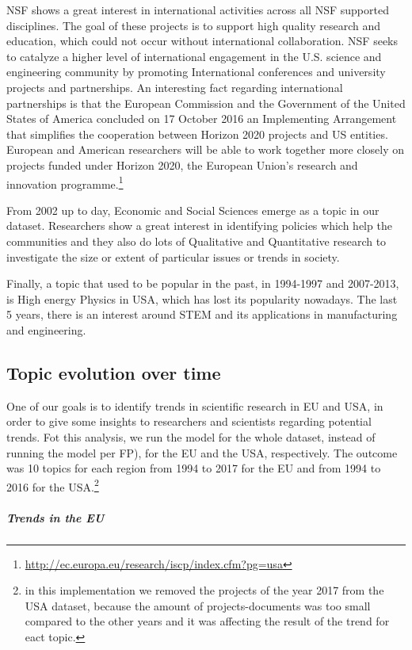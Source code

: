 \documentclass[12pt]{report}
\begin{document}
NSF shows a great interest in international activities across all NSF supported
disciplines. The goal of these projects is to support high quality research and
education, which could not occur without international collaboration. NSF seeks
to catalyze a higher level of international engagement in the U.S. science and
engineering community by promoting International conferences and university
projects and partnerships. An interesting fact regarding international
partnerships is that the European Commission and the Government of the United
States of America concluded on 17 October 2016 an Implementing Arrangement that
simplifies the cooperation between Horizon 2020 projects and US entities.
European and American researchers will be able to work together more closely on
projects funded under Horizon 2020, the European Union's research and innovation
programme.\footnote{\url{http://ec.europa.eu/research/iscp/index.cfm?pg=usa}}

From 2002 up to day, Economic and Social Sciences emerge as a topic in our
dataset. Researchers show a great interest in identifying policies which help
the communities and they also do lots of Qualitative and Quantitative research
to investigate the size or extent of particular issues or trends in society.

Finally, a topic that used to be popular in the past, in 1994-1997 and
2007-2013, is High energy Physics in USA, which has lost its popularity
nowadays. The last 5 years, there is an interest around STEM and its
applications in manufacturing and engineering.


\subsection{Topic evolution over time}

One of our goals is to identify trends in scientific research in EU and USA, in
order to give some insights to researchers and scientists regarding potential
trends. Fot this analysis, we run the model for the whole dataset, instead of
running the model per FP), for the EU and the USA, respectively. The outcome was
10 topics for each region from 1994 to 2017 for the EU and from 1994 to 2016 for
the USA.\footnote{in this implementation we removed the projects of the year
2017 from the USA dataset, because the amount of projects-documents was too
small compared to the other years and it was affecting the result of the trend
for eact topic.}

\subparagraph{Trends in the EU}
\end{document}
